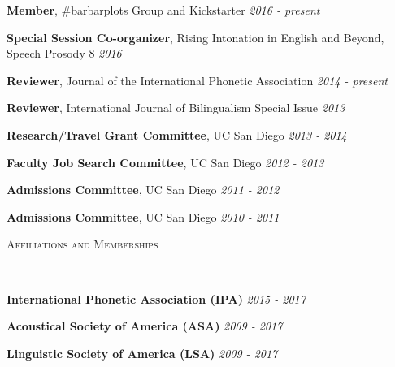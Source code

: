 \documentclass[9pt]{article}
\newenvironment{changemargin}[2]{%
  \begin{list}{}{%
    \setlength{\topsep}{0pt}%
    \setlength{\leftmargin}{#1}%
    \setlength{\rightmargin}{#2}%
    \setlength{\listparindent}{\parindent}%
    \setlength{\itemindent}{\parindent}%
    \setlength{\parsep}{\parskip}%
  }%
  \item[]}{\end{list}
}
\newcommand{\lineover}{
	\begin{changemargin}{-0.05in}{-0.05in}
		\vspace*{-8pt}
		\hrulefill \\
		\vspace*{-2pt}
	\end{changemargin}
}
\newcommand{\header}[1]{
	\begin{changemargin}{-0.5in}{-0.5in}
		\scshape{#1}\\
  	\lineover
	\end{changemargin}
}
\newenvironment{body} {
	\vspace*{-16pt}
	\begin{changemargin}{-0.25in}{-0.5in}
  }	
	{\end{changemargin}
}
\begin{document}
\begin{body}
	\vspace{14pt}
	
	\textbf{Member}, \#barbarplots Group and Kickstarter \hfill \emph{2016 - present} \\
	\medskip
	
	\textbf{Special Session Co-organizer}, Rising Intonation in English and Beyond, Speech Prosody 8 \hfill \emph{2016} \\
	\medskip
	
	\textbf{Reviewer}, Journal of the International Phonetic Association \hfill \emph{2014 - present} \\
	\medskip

	\textbf{Reviewer}, International Journal of Bilingualism Special Issue \hfill \emph{2013} \\
	\medskip
	
	\textbf{Research/Travel Grant Committee}, UC San Diego \hfill \emph{2013 - 2014} \\
	\medskip

	\textbf{Faculty Job Search Committee}, UC San Diego \hfill \emph{2012 - 2013} \\
	\medskip
	
	\textbf{Admissions Committee}, UC San Diego \hfill \emph{2011 - 2012} \\
	\medskip
	
	\textbf{Admissions Committee}, UC San Diego \hfill \emph{2010 - 2011} \\

\end{body}

\smallskip


\header{Affiliations and Memberships}

\begin{body}
	\vspace{14pt}
	
	\textbf{International Phonetic Association (IPA)} \hfill{} \emph{2015 - 2017}\\
	\medskip
	
	\textbf{Acoustical Society of America (ASA)} \hfill{} \emph{2009 - 2017}\\
	\medskip

	\textbf{Linguistic Society of America (LSA)} \hfill{} \emph{2009 - 2017}\\
	\medskip

\end{body}
\end{document}
